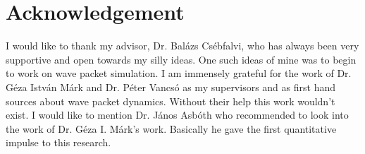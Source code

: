 \section{Acknowledgement}

I would like to thank my advisor, Dr. Balázs Csébfalvi, who has always been very supportive and open towards my silly ideas. One such ideas of mine was to begin to work on wave packet simulation.
I am immensely grateful for the work of Dr. Géza István Márk and Dr. Péter Vancsó as my supervisors and as first hand sources about wave packet dynamics.
Without their help this work wouldn't exist.
I would like to mention Dr. János Asbóth who recommended to look into the work of Dr. Géza I. Márk's work.
Basically he gave the first quantitative impulse to this research.



